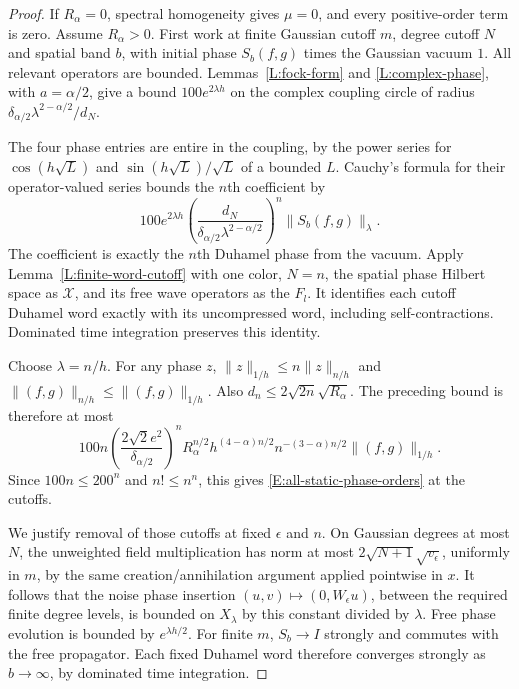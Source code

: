 \documentclass[12pt]{article}
\numberwithin{equation}{section}
\theoremstyle{definition}
\begin{document}
\begin{proof}
  If $R_\alpha=0$, spectral homogeneity gives $\mu=0$, and every
  positive-order term is zero. Assume $R_\alpha>0$.
  First work at finite Gaussian cutoff $m$, degree cutoff $N$ and
  spatial band $b$, with initial phase $S_b(f,g)$ times the Gaussian
  vacuum $1$. All relevant operators are bounded.
  Lemmas~\ref{L:fock-form} and \ref{L:complex-phase}, with $a=\alpha/2$,
  give a bound $100e^{2\lambda h}$ on the complex coupling circle
  of radius $\delta_{\alpha/2}\lambda^{2-\alpha/2}/d_N$.

  The four phase entries are entire in the coupling, by the power series
  for $\cos(h\sqrt L)$ and $\sin(h\sqrt L)/\sqrt L$ of a bounded $L$.
  Cauchy's formula for their operator-valued series bounds the $n$th
  coefficient by
  \[
    100e^{2\lambda h}
    \left(\frac{d_N}
    {\delta_{\alpha/2}\lambda^{2-\alpha/2}}\right)^n
    \|S_b(f,g)\|_\lambda .
  \]
  The coefficient is exactly the $n$th Duhamel phase from the vacuum.
  Apply Lemma~\ref{L:finite-word-cutoff} with one color, $N=n$,
  the spatial phase Hilbert space as $\mathscr X$, and its free wave
  operators as the $F_l$. It identifies each cutoff Duhamel word
  exactly with its uncompressed word, including self-contractions.
  Dominated time integration preserves this identity.

  Choose $\lambda=n/h$. For any phase $z$,
  $\|z\|_{1/h}\le n\|z\|_{n/h}$ and
  $\|(f,g)\|_{n/h}\le\|(f,g)\|_{1/h}$.
  Also $d_n\le2\sqrt{2n}\sqrt{R_\alpha}$.
  The preceding bound is therefore at most
  \[
    100n\left(\frac{2\sqrt2 e^2}{\delta_{\alpha/2}}\right)^n
    R_\alpha^{n/2}h^{(4-\alpha)n/2}
    n^{-(3-\alpha)n/2}\|(f,g)\|_{1/h}.
  \]
  Since $100n\le200^n$ and $n!\le n^n$, this gives
  \eqref{E:all-static-phase-orders} at the cutoffs.

  We justify removal of those cutoffs at fixed $\epsilon$ and $n$.
  On Gaussian degrees at most $N$, the unweighted field multiplication
  has norm at most $2\sqrt{N+1}\sqrt{v_\epsilon}$, uniformly in $m$,
  by the same creation/annihilation argument applied pointwise in $x$.
  It follows that the noise phase insertion
  $(u,v)\mapsto(0,W_\epsilon u)$, between the required finite degree
  levels, is bounded on $X_\lambda$ by this constant divided by
  $\lambda$. Free phase evolution is bounded by $e^{\lambda h/2}$.
  For finite $m$, $S_b\to I$ strongly and commutes with the free
  propagator. Each fixed Duhamel word therefore converges strongly
  as $b\to\infty$, by dominated time integration.


\end{proof}
\end{document}
